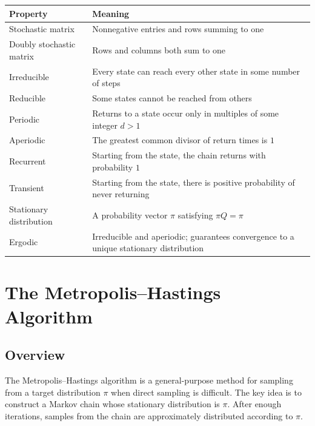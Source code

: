 \documentclass[12pt,oneside]{book}
\numberwithin{equation}{section}
\theoremstyle{definition}
\theoremstyle{plain}
\theoremstyle{remark}
\begin{document}
\begin{center}
\begin{xltabular}{\textwidth}{>{\raggedright\arraybackslash}p{0.25\textwidth}
>{\raggedright\arraybackslash}X}
\toprule
Property & Meaning \\
\midrule
Stochastic matrix
& Nonnegative entries and rows summing to one \\

Doubly stochastic matrix
& Rows and columns both sum to one \\

Irreducible
& Every state can reach every other state in some number of steps \\

Reducible
& Some states cannot be reached from others \\

Periodic
& Returns to a state occur only in multiples of some integer $d>1$ \\

Aperiodic
& The greatest common divisor of return times is $1$ \\

Recurrent
& Starting from the state, the chain returns with probability $1$ \\

Transient
& Starting from the state, there is positive probability of never returning \\

Stationary distribution
& A probability vector $\pi$ satisfying $\pi Q=\pi$ \\

Ergodic
& Irreducible and aperiodic; guarantees convergence to a unique stationary distribution \\
\bottomrule
\end{xltabular}
\end{center}

\chapter{The Metropolis--Hastings Algorithm}

\section{Overview}

The Metropolis--Hastings algorithm is a general-purpose method for sampling from a target distribution $\pi$ when direct sampling is difficult. The key idea is to construct a Markov chain whose stationary distribution is $\pi$. After enough iterations, samples from the chain are approximately distributed according to $\pi$.
\end{document}
